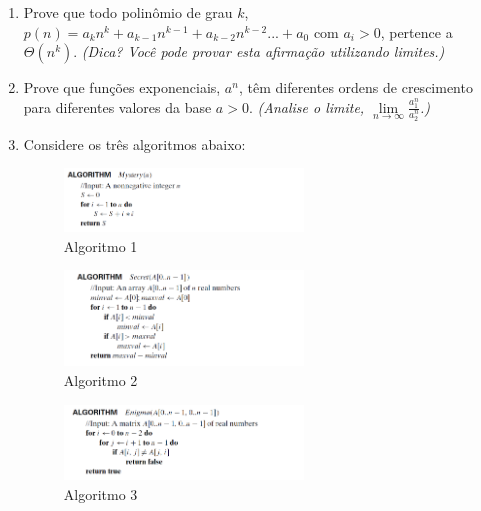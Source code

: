 \documentclass{article}
\begin{document}
\begin{enumerate}
    
    \item Prove que todo polinômio de grau $k$, $p(n)=a_kn^k + a_{k-1}n^{k-1} + a_{k-2}n^{k-2} ...+ a_0$ com $a_i > 0$, pertence a $\Theta(n^k)$. \textit{(Dica? Você pode provar esta afirmação utilizando limites.)}

    \item Prove que funções exponenciais, $a^n$, têm diferentes ordens de crescimento para diferentes valores da base $a>0$. \textit{(Analise o limite, $\underset{n\rightarrow \infty}{\lim}\frac{a_1^n}{a_2^n}$.)}
    
    
    \item Considere os três algoritmos abaixo: %
    
    \begin{figure}[!ht]
        \centering
        \includegraphics[width=0.6\textwidth]{alg1.PNG}
        \caption{Algoritmo 1}
        \label{fig:my_label}
    \end{figure}
    
    \begin{figure}[!ht]
        \centering
        \includegraphics[width=0.6\textwidth]{alg2.PNG}
        \caption{Algoritmo 2}
        \label{fig:my_label}
    \end{figure}
    
    \begin{figure}[!ht]
        \centering
        \includegraphics[width=0.6\textwidth]{alg3.PNG}
        \caption{Algoritmo 3}
        \label{fig:my_label}
    \end{figure}
    

\end{enumerate}
\end{document}
